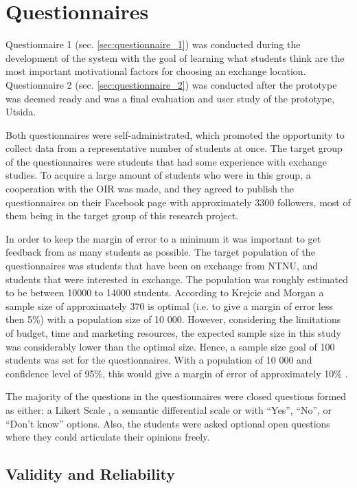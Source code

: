 \section{Questionnaires}

Questionnaire 1 (sec. \ref{sec:questionnaire_1}) was conducted during the development of the system with the goal of learning what students think are the most important motivational factors for choosing an exchange location. Questionnaire 2 (sec. \ref{sec:questionnaire_2}) was conducted after the prototype was deemed ready and was a final evaluation and user study of the prototype, Utsida.

Both questionnaires were self-administrated, which promoted the opportunity to collect data from a representative number of students at once. The target group of the questionnaires were students that had some experience with exchange studies. To acquire a large amount of students who were in this group, a cooperation with the OIR was made, and they agreed to publish the questionnaires on their Facebook page with approximately 3300 followers, most of them being in the target group of this research project.

In order to keep the margin of error to a minimum it was important to get feedback from as many students as possible. The target population of the questionnaires was students that have been on exchange from NTNU, and students that were interested in exchange. The population was roughly estimated to be between 10000 to 14000 students. According to Krejcie and Morgan \cite{krejcie1970determining} a sample size of approximately 370 is optimal (i.e. to give a margin of error less then 5\%) with a population size of 10 000. However, considering the limitations of budget, time and marketing resources, the expected sample size in this study was considerably lower than the optimal size. Hence, a sample size goal of 100 students was set for the questionnaires. With a population of 10 000 and confidence level of 95\%, this would give a margin of error of approximately 10\% \cite{yamane1973statistics}. 

The majority of the questions in the questionnaires were closed questions formed as either: a Likert Scale \cite{allen2007likert}, a semantic differential scale \cite{osgood1952nature} or with \enquote{Yes}, \enquote{No}, or \enquote{Don't know} options. Also, the students were asked optional open questions where they could articulate their opinions freely. 

\subsection{Validity and Reliability}

